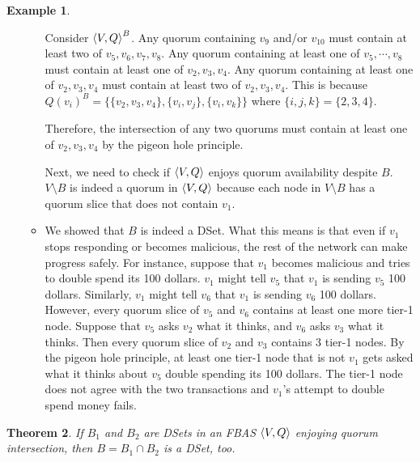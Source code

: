 \documentclass[12pt, psamsfonts]{amsart}
\newtheorem{thm}{Theorem}[section]
\theoremstyle{definition}
\newtheorem{exmp}[thm]{Example}
\theoremstyle{remark}
\numberwithin{equation}{section}
\begin{document}
\begin{exmp}
\begin{itemize}
\begin{itemize}
                    Consider $\ev{V, Q}^B$.
                    Any quorum containing $v_9$ and/or $v_{10}$ must contain at least two of $v_5, v_6, v_7, v_8$.
                    Any quorum containing at least one of $v_5, \cdots, v_8$ must contain at least one of $v_2, v_3, v_4$.
                    Any quorum containing at least one of $v_2, v_3, v_4$ must contain at least two of $v_2, v_3, v_4$.
                    This is because $Q(v_i)^B = \{ \{ v_2, v_3, v_4 \}, \{ v_i, v_j \}, \{ v_i, v_k \} \}$ where $\{ i, j, k \} = \{ 2, 3, 4 \}$.

                    Therefore, the intersection of any two quorums must contain at least one of $v_2, v_3, v_4$ by the pigeon hole principle.

                    Next, we need to check if $\ev{V, Q}$ enjoys quorum availability despite $B$.
                    $V \setminus B$ is indeed a quorum in $\ev{V, Q}$ because each node in $V \setminus B$ has a quorum slice that does not contain $v_1$.
                \item
                    We showed that $B$ is indeed a DSet.
                    What this means is that even if $v_1$ stops responding or becomes malicious, the rest of the network can make progress safely.
                    For instance, suppose that $v_1$ becomes malicious and tries to double spend its 100 dollars.
                    $v_1$ might tell $v_5$ that $v_1$ is sending $v_5$ 100 dollars.
                    Similarly, $v_1$ might tell $v_6$ that $v_1$ is sending $v_6$ 100 dollars.
                    However, every quorum slice of $v_5$ and $v_6$ contains at least one more tier-1 node.
                    Suppose that $v_5$ asks $v_2$ what it thinks, and $v_6$ asks $v_3$ what it thinks.
                    Then every quorum slice of $v_2$ and $v_3$ contains 3 tier-1 nodes.
                    By the pigeon hole principle, at least one tier-1 node that is not $v_1$ gets asked what it thinks about $v_5$ double spending its 100 dollars.
                    The tier-1 node does not agree with the two transactions and $v_1$'s attempt to double spend money fails.
            \end{itemize}
    \end{itemize}
\end{exmp}

\begin{thm}\label{intersection_dset}
    If $B_1$ and $B_2$ are DSets in an FBAS $\ev{V, Q}$ enjoying quorum intersection, then $B = B_1 \cap B_2$ is a DSet, too.
\end{thm}
\end{document}
